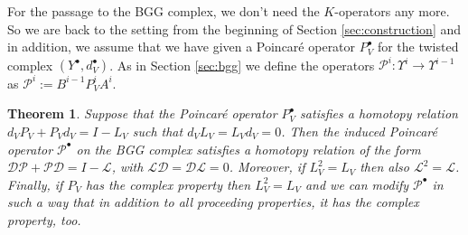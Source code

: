 \documentclass[11pt]{amsart}
\newtheorem{theorem}{Theorem}
\newcommand{\0}{\mathaccent23}
\newcommand{\bs}{{\scriptscriptstyle \bullet}}
\begin{document}
For the passage to the BGG complex, we don't need the $K$-operators any more. So we are back to the setting from the beginning of Section \ref{sec:construction} and in addition, we assume that we have given a Poincar\'e operator $P_V^\bs$ for the twisted complex $(Y^\bs,d_V^\bs)$. As in Section \ref{sec:bgg} we define the operators $\mathscr{P}^{i}:\Upsilon^i\to\Upsilon^{i-1}$ as $\mathscr{P}^{i}:=B^{i-1}P^{i}_{V} A^{i}$.
\begin{theorem}
Suppose that the Poincar\'e operator $P_V^\bs$ satisfies a homotopy relation $d_VP_V+P_Vd_V=I-L_V$ such that $d_VL_V=L_Vd_V=0$. Then the induced Poincar\'e operator $\mathscr{P}^\bs$ on the BGG complex satisfies a homotopy relation of the form $\mathscr{D}\mathscr{P}+\mathscr{P}\mathscr{D}=I-\mathscr{L}$, with $\mathscr{L}\mathscr{D}=\mathscr{D}\mathscr{L}=0$. Moreover, if $L_V^2=L_V$ {then} also $\mathscr{L}^2=\mathscr{L}$. Finally, if $P_V$ has the complex property then $L_V^2=L_V$ and we can modify $\mathscr{P}^\bs$ in such a way that in addition to all proceeding properties, it has the complex property, too. 
\end{theorem}
\end{document}
